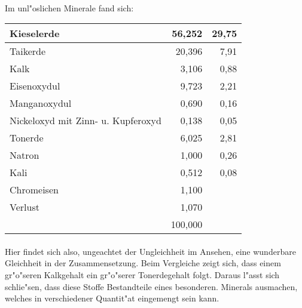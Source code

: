 \documentclass[a4paper, 11pt, oneside]{article}
\begin{document}
\paragraph{}
Im unl"oslichen Minerale fand sich:
\begin{center}
\begin{tabular}{ |p{30mm}|r|r| }
    \hline
    Kieselerde & 56,252 & 29,75\\\hline
    Taikerde & 20,396 & 7,91\\\hline
    Kalk & 3,106 & 0,88\\\hline
    Eisenoxydul & 9,723 & 2,21\\\hline
    Manganoxydul & 0,690 & 0,16\\\hline
    Nickeloxyd mit Zinn- u. Kupferoxyd & 0,138 & 0,05\\\hline
    Tonerde & 6,025 & 2,81\\\hline
    Natron & 1,000 & 0,26\\\hline
    Kali & 0,512 & 0,08\\\hline
    Chromeisen & 1,100 & \\\hline
    Verlust & 1,070 & \\\hline
     & 100,000 & \\
    \hline
\end{tabular}
\end{center}
\paragraph{}
Hier findet sich also, ungeachtet der Ungleichheit im Ansehen, eine wunderbare Gleichheit in der Zusammensetzung. Beim Vergleiche zeigt sich, dass einem gr"o"seren Kalkgehalt ein gr"o"serer Tonerdegehalt folgt. Daraus l"asst sich schlie"sen, dass diese Stoffe Bestandteile eines besonderen. Minerals ausmachen, welches in verschiedener Quantit"at eingemengt sein kann.
\end{document}
